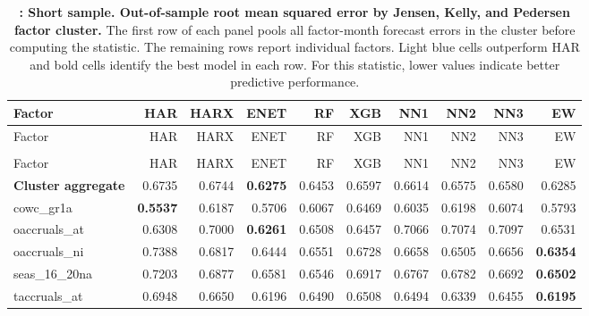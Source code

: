 \begin{longtable}{>{\raggedright\arraybackslash}p{2.6cm}rrrrrrrrr}
\caption[Out-of-sample root mean squared error by Jensen, Kelly, and Pedersen factor cluster.]{\footnotesize \textbf{: Short sample. Out-of-sample root mean squared error by Jensen, Kelly, and Pedersen factor cluster.} The first row of each panel pools all factor-month forecast errors in the cluster before computing the statistic. The remaining rows report individual factors. Light blue cells outperform HAR and bold cells identify the best model in each row. For this statistic, lower values indicate better predictive performance.}\label{tab:rv-factor_rmse-short}\\
\hline
Factor & HAR & HARX & ENET & RF & XGB & NN1 & NN2 & NN3 & EW \\
\hline\endfirsthead
\hline
Factor & HAR & HARX & ENET & RF & XGB & NN1 & NN2 & NN3 & EW \\
\hline\endhead
\hline\endfoot
\multicolumn{10}{@{}l}{\textit{Panel A. Accruals}} \\
\hline
Factor & HAR & HARX & ENET & RF & XGB & NN1 & NN2 & NN3 & EW \\
\hline
\textbf{Cluster aggregate} & 0.6735 & 0.6744 & \textbf{\cellcolor{blue!10}0.6275} & \cellcolor{blue!10}0.6453 & \cellcolor{blue!10}0.6597 & \cellcolor{blue!10}0.6614 & \cellcolor{blue!10}0.6575 & \cellcolor{blue!10}0.6580 & \cellcolor{blue!10}0.6285 \\
cowc\_gr1a & \textbf{0.5537} & 0.6187 & 0.5706 & 0.6067 & 0.6469 & 0.6035 & 0.6198 & 0.6074 & 0.5793 \\
oaccruals\_at & 0.6308 & 0.7000 & \textbf{\cellcolor{blue!10}0.6261} & 0.6508 & 0.6457 & 0.7066 & 0.7074 & 0.7097 & 0.6531 \\
oaccruals\_ni & 0.7388 & \cellcolor{blue!10}0.6817 & \cellcolor{blue!10}0.6444 & \cellcolor{blue!10}0.6551 & \cellcolor{blue!10}0.6728 & \cellcolor{blue!10}0.6658 & \cellcolor{blue!10}0.6505 & \cellcolor{blue!10}0.6656 & \textbf{\cellcolor{blue!10}0.6354} \\
seas\_16\_20na & 0.7203 & \cellcolor{blue!10}0.6877 & \cellcolor{blue!10}0.6581 & \cellcolor{blue!10}0.6546 & \cellcolor{blue!10}0.6917 & \cellcolor{blue!10}0.6767 & \cellcolor{blue!10}0.6782 & \cellcolor{blue!10}0.6692 & \textbf{\cellcolor{blue!10}0.6502} \\
taccruals\_at & 0.6948 & \cellcolor{blue!10}0.6650 & \cellcolor{blue!10}0.6196 & \cellcolor{blue!10}0.6490 & \cellcolor{blue!10}0.6508 & \cellcolor{blue!10}0.6494 & \cellcolor{blue!10}0.6339 & \cellcolor{blue!10}0.6455 & \textbf{\cellcolor{blue!10}0.6195} \\

\end{longtable}
